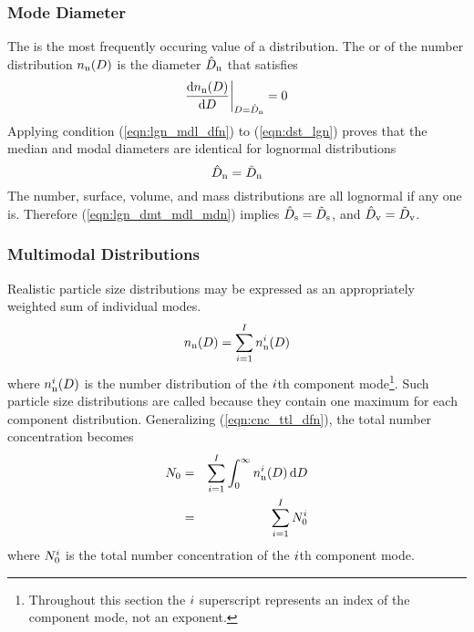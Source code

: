 \documentclass[12pt,twoside]{article}
\begin{document}
\subsubsection[Mode Diameter]{Mode Diameter}\label{sxn:mod}
The  is the most frequently occuring value of a
distribution. 
The  or  of the 
number distribution $n_{\mathrm{n}}(D)$ is the diameter $\hat{D}_{\mathrm{n}}$ that
satisfies 
\begin{equation}
\frac{\mathrm{d}n_{\mathrm{n}}(D)}{\mathrm{d}D}\bigg|_{D=\hat{D}_{\mathrm{n}}} = 0
\label{eqn:lgn_mdl_dfn}
\end{equation}
Applying condition (\ref{eqn:lgn_mdl_dfn}) to (\ref{eqn:dst_lgn})
proves that the median and modal diameters are identical for lognormal 
distributions 
\begin{equation}
\hat{D}_{\mathrm{n}} = \tilde{D}_{\mathrm{n}}
\label{eqn:lgn_dmt_mdl_mdn}
\end{equation}
The number, surface, volume, and mass distributions are all lognormal 
if any one is.
Therefore (\ref{eqn:lgn_dmt_mdl_mdn}) implies $\hat{D}_{\mathrm{s}} = \tilde{D}_{\mathrm{s}}$,
and $\hat{D}_{\mathrm{v}} = \tilde{D}_{\mathrm{v}}$.

\subsubsection[Multimodal Distributions]{Multimodal Distributions}\label{sxn:mlt}
Realistic particle size distributions may be expressed as an
appropriately weighted sum of individual modes. 
\begin{equation}
n_{\mathrm{n}}(D) = \sum_{i = 1}^{I} n_{\mathrm{n}}^{i}(D)
\label{eqn:dst_nbr_mlt_dfn}
\end{equation}
where $n_{\mathrm{n}}^{i}(D)$ is the number distribution of the $i$th 
component mode\footnote{Throughout this section the $i$
superscript represents an index of the component mode, not an
exponent.}. 
Such particle size distributions are called  because they contain one maximum for each component
distribution. 
Generalizing (\ref{eqn:cnc_ttl_dfn}), the total number concentration 
becomes
\begin{eqnarray}
N_{0} & = & \sum_{i = 1}^{I} \int_{0}^{\infty} 
n_{\mathrm{n}}^{i}(D) \,\mathrm{d}D \nonumber \\
& = & \sum_{i = 1}^{I} N_{0}^{i}
\label{eqn:cnc_ttl_dfn_mlt}
\end{eqnarray}
where $N_{0}^{i}$ is the total number concentration of the
$i$th component mode. 
\end{document}
